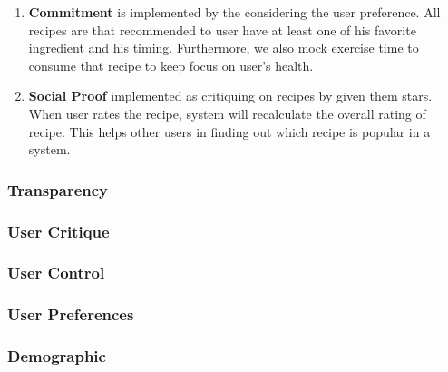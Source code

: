 \begin{enumerate}
  	
  	\item \textbf{Commitment} is implemented by the considering the user preference. All recipes are that recommended to user have at least one of his favorite ingredient and his timing. Furthermore, we also mock exercise time to consume that recipe to keep focus on user’s health.  	  
  	
  	
  	\item \textbf{Social Proof} implemented as critiquing on recipes by given them stars. When user rates the recipe, system will recalculate the overall rating of recipe.  This helps other users in finding out which recipe is popular in a system.  	  
  	
  \end{enumerate}
\subsubsection{Transparency}

\subsubsection{User Critique}

\subsubsection{User Control}

\subsubsection{User Preferences}

\subsubsection{Demographic}